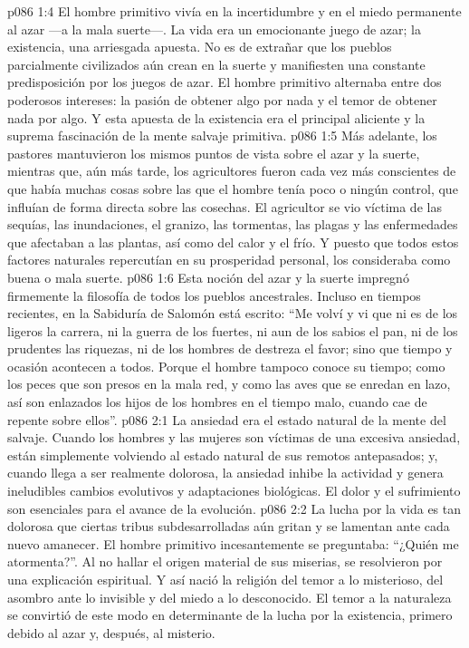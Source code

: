 \vs p086 1:4 El hombre primitivo vivía en la incertidumbre y en el miedo permanente al azar ---a la mala suerte---. La vida era un emocionante juego de azar; la existencia, una arriesgada apuesta. No es de extrañar que los pueblos parcialmente civilizados aún crean en la suerte y manifiesten una constante predisposición por los juegos de azar. El hombre primitivo alternaba entre dos poderosos intereses: la pasión de obtener algo por nada y el temor de obtener nada por algo. Y esta apuesta de la existencia era el principal aliciente y la suprema fascinación de la mente salvaje primitiva.
\vs p086 1:5 Más adelante, los pastores mantuvieron los mismos puntos de vista sobre el azar y la suerte, mientras que, aún más tarde, los agricultores fueron cada vez más conscientes de que había muchas cosas sobre las que el hombre tenía poco o ningún control, que influían de forma directa sobre las cosechas. El agricultor se vio víctima de las sequías, las inundaciones, el granizo, las tormentas, las plagas y las enfermedades que afectaban a las plantas, así como del calor y el frío. Y puesto que todos estos factores naturales repercutían en su prosperidad personal, los consideraba como buena o mala suerte.
\vs p086 1:6 Esta noción del azar y la suerte impregnó firmemente la filosofía de todos los pueblos ancestrales. Incluso en tiempos recientes, en la Sabiduría de Salomón está escrito: “Me volví y vi que ni es de los ligeros la carrera, ni la guerra de los fuertes, ni aun de los sabios el pan, ni de los prudentes las riquezas, ni de los hombres de destreza el favor; sino que tiempo y ocasión acontecen a todos. Porque el hombre tampoco conoce su tiempo; como los peces que son presos en la mala red, y como las aves que se enredan en lazo, así son enlazados los hijos de los hombres en el tiempo malo, cuando cae de repente sobre ellos”.
\vs p086 2:1 La ansiedad era el estado natural de la mente del salvaje. Cuando los hombres y las mujeres son víctimas de una excesiva ansiedad, están simplemente volviendo al estado natural de sus remotos antepasados; y, cuando llega a ser realmente dolorosa, la ansiedad inhibe la actividad y genera ineludibles cambios evolutivos y adaptaciones biológicas. El dolor y el sufrimiento son esenciales para el avance de la evolución.
\vs p086 2:2 La lucha por la vida es tan dolorosa que ciertas tribus subdesarrolladas aún gritan y se lamentan ante cada nuevo amanecer. El hombre primitivo incesantemente se preguntaba: “¿Quién me atormenta?”. Al no hallar el origen material de sus miserias, se resolvieron por una explicación espiritual. Y así nació la religión del temor a lo misterioso, del asombro ante lo invisible y del miedo a lo desconocido. El temor a la naturaleza se convirtió de este modo en determinante de la lucha por la existencia, primero debido al azar y, después, al misterio.
